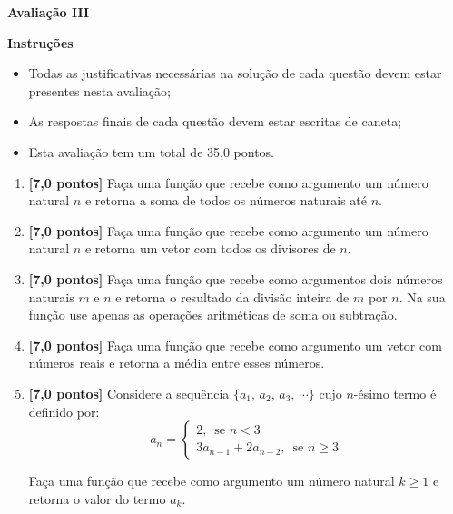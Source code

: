 \documentclass[12pt,a4paper]{article}
\begin{document}
\begin{center}
 \textbf{Avaliação III}
\end{center}

\textbf{Instruções}
\begin{itemize}
 \item Todas as justificativas necessárias na solução de cada questão devem 
 estar presentes nesta avaliação;
 \item As respostas finais de cada questão devem estar escritas de caneta;
 \item Esta avaliação tem um total de 35,0 pontos.
\end{itemize}

\begin{enumerate}
  \item  \textbf{[7,0 pontos]} Faça uma função que recebe como argumento um número
  natural $n$ e retorna a soma de todos os números naturais até $n$.

  \item  \textbf{[7,0 pontos]} Faça uma função que recebe como argumento um número
  natural $n$ e retorna um vetor com todos os divisores de $n$.
  
  \item \textbf{[7,0 pontos]} Faça uma função que recebe como argumentos dois números
  naturais $m$ e $n$ e retorna o resultado da divisão inteira de $m$ por $n$.
  Na sua função use apenas as operações aritméticas de soma ou subtração.

  \item \textbf{[7,0 pontos]} Faça uma função que recebe como argumento um vetor
  com números reais e retorna a média entre esses números.
 
  \item \textbf{[7,0 pontos]} Considere a sequência $\{a_1,\,a_2,\,a_3,\,\cdots\}$ cujo $n$-ésimo
  termo é definido por:
  $$a_n = 
      \begin{cases}
      2,\,\textrm{ se } n < 3 \\
      3a_{n-1} + 2a_{n-2},\,\textrm{ se } n \geq 3
      \end{cases}
  $$
  
  Faça uma função que recebe como argumento um número natural $k \geq 1$ e retorna o valor do termo $a_k$.

\end{enumerate}
\end{document}
